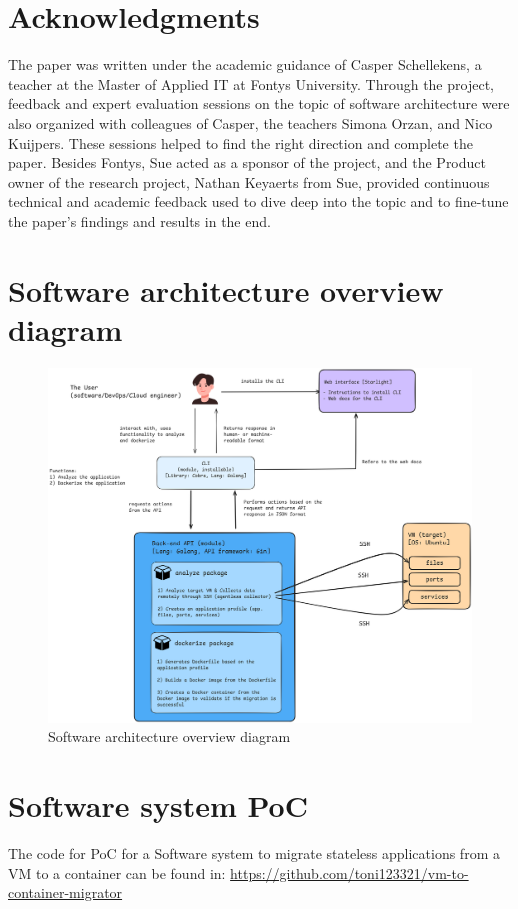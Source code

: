 \documentclass[twocolumn]{article}
\begin{document}
\section{Acknowledgments}
The paper was written under the academic guidance of Casper Schellekens, a teacher at the Master of Applied IT at Fontys University. Through the project, feedback and expert evaluation sessions on the topic of software architecture were also organized with colleagues of Casper, the teachers Simona Orzan, and Nico Kuijpers. These sessions helped to find the right direction and complete the paper. Besides Fontys, Sue acted as a sponsor of the project, and the Product owner of the research project, Nathan Keyaerts from Sue, provided continuous technical and academic feedback used to dive deep into the topic and to fine-tune the paper's findings and results in the end.

\printbibliography

\onecolumn
\begin{appendices}
\section{Software architecture overview diagram}
\label{appendix:software-arch-overview-diagram}
\begin{figure}[hbt]
    \centering
    \includegraphics[width=\linewidth]{images/software-architecture-overview.png}
    \caption{Software architecture overview diagram}
\end{figure}

\section{Software system PoC}
\label{appendix:PoC}
The code for PoC for a Software system to migrate stateless applications from a VM to a container can be found in: \href{https://github.com/toni123321/vm-to-container-migrator}{https://github.com/toni123321/vm-to-container-migrator}
\end{appendices}
\end{document}
